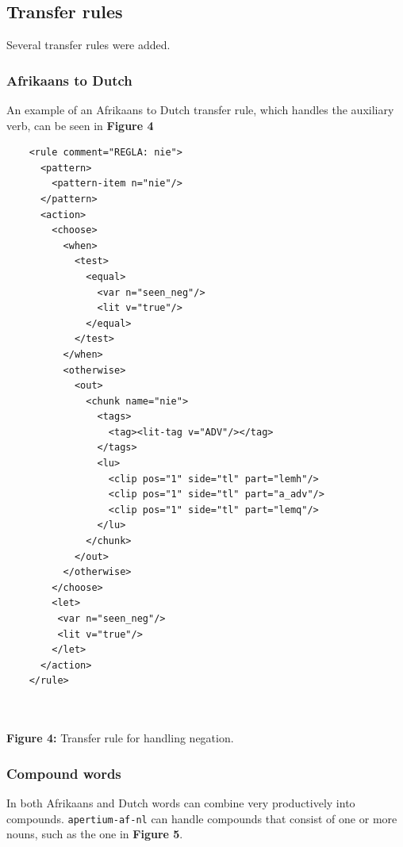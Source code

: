 \documentclass[a0,landscape]{a0poster}
\begin{document}
\begin{multicols}{4}
\subsection{Transfer rules}
Several transfer rules were added.

\subsubsection{Afrikaans to Dutch}
An example of an Afrikaans to Dutch transfer rule, which handles the auxiliary verb, can be seen in
{\bf Figure 4}

\begin{center}
\begin{minipage}[b]{25cm}
\begin{small}
\begin{verbatim}
    <rule comment="REGLA: nie">
      <pattern>
        <pattern-item n="nie"/>
      </pattern>
      <action>
        <choose>
          <when>
            <test>
              <equal>
                <var n="seen_neg"/>
                <lit v="true"/>
              </equal>
            </test>
          </when>
          <otherwise>
            <out>
              <chunk name="nie">
                <tags>
                  <tag><lit-tag v="ADV"/></tag>
                </tags>
                <lu>
                  <clip pos="1" side="tl" part="lemh"/>
                  <clip pos="1" side="tl" part="a_adv"/>
                  <clip pos="1" side="tl" part="lemq"/>
                </lu>
              </chunk>
            </out>
          </otherwise>
        </choose>
        <let>
         <var n="seen_neg"/>
         <lit v="true"/>
        </let>
      </action>
    </rule>
\end{verbatim}
\end{small}
\end{minipage}\\
~\\
\textbf{Figure 4:} Transfer rule for handling negation.
\vspace{0.5cm}
\end{center}

\subsubsection{Compound words}
In both Afrikaans and Dutch words can combine very productively into compounds.
{\small {\tt apertium-af-nl}} can handle compounds that consist of one or more nouns, 
such as the one in {\bf Figure 5}. \\


\end{multicols}
\end{document}
